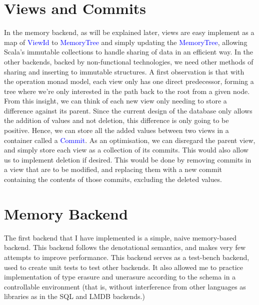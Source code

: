 \documentclass[12pt,a4paper,twoside,openright]{report}
\newcommand\codeName[1]{\textcolor{blue}{#1}}
\begin{document}
\section{Views and Commits}
In the memory backend, as will be explained later, views are easy implement as a map of \codeName{ViewId} to \codeName{MemoryTree} and simply updating the \codeName{MemoryTree}, allowing Scala’s immutable collections to handle sharing of data in an efficient way. In the other backends, backed by non-functional technologies, we need other methods of sharing and inserting to immutable structures. A first observation is that with the operation monad model, each view only has one direct predecessor, forming a tree where we’re only interested in the path back to the root from a given node. From this insight, we can think of each new view only needing to store a difference against its parent. Since the current design of the database only allows the addition of values and not deletion, this difference is only going to be positive. Hence, we can store all the added values between two views in a container called a \codeName{Commit}. As an optimisation, we can disregard the parent view, and simply store each view as a collection of its commits. This would also allow us to implement deletion if desired. This would be done by removing commits in a view that are to be modified, and replacing them with a new commit containing the contents of those commits, excluding the deleted values.

\section{Memory Backend}
The first backend that I have implemented is a simple, naive memory-based backend. This backend follows the denotational semantics, and makes very few attempts to improve performance. This backend serves as a test-bench backend, used to create unit tests to test other backends. It also allowed me to practice implementation of type erasure and unerasure according to the schema in a controllable environment (that is, without interference from other languages as libraries as in the SQL and LMDB backends.)
\end{document}
